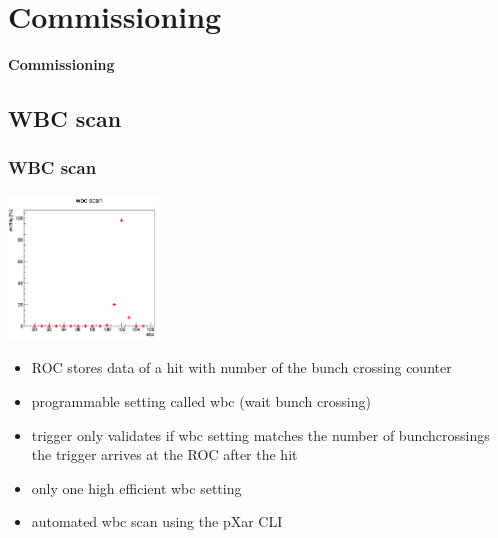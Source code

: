 \documentclass[9pt]{beamer}
\begin{document}
\section{Commissioning}
\begin{frame}
	\begin{alertblock}{
		\begin{center}
			\Large{\textbf{Commissioning}}
		\end{center}}
	\end{alertblock}
\end{frame}
\subsection{WBC scan}
\begin{frame}
	\frametitle{WBC scan}
	\begin{center}
		\begin{minipage}{4.0cm}
			\centering
			\includegraphics[width=4.0cm]{Pics/wbcscan2}
		\end{minipage}
		\hspace*{2pt}
		\begin{minipage}[c][.7\textheight]{7cm}
			\begin{itemize}
				\setlength{\itemsep}{\fill}
				\item ROC stores data of a hit with number of the bunch crossing counter
				\item programmable setting called wbc (wait bunch crossing)
				\item trigger only validates if wbc setting matches the number of bunchcrossings the trigger arrives at the ROC after the hit 
				\item only one high efficient wbc setting
				\item automated wbc scan using the pXar CLI
			\end{itemize}
		\end{minipage}\no\s
	\end{center}
\end{frame}
\end{document}
